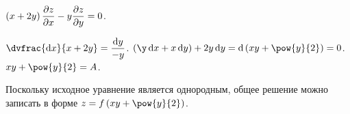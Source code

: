 \documentclass[a5paper,10pt]{article}
\begin{document}
    $\left(\hspace{0.01em}x + 2y\hspace{0.01em}\right) \dfrac{\partial z}{\partial x} - y \dfrac{\partial z}{\partial y} = 0$.

    $\dvfrac{\di x}{x + 2y} = \dfrac{\di y}{-y}$.
    $\br{\y \di x + x \di y} + 2y \di y 
    = \di \br{xy + \pow{y}{2}}
    = 0$.
    $xy + \pow{y}{2} = A$.
    
    Поскольку исходное уравнение является однородным, общее решение можно записать
    в форме
    $z = f\br{xy + \pow{y}{2}}$.
\end{document}
